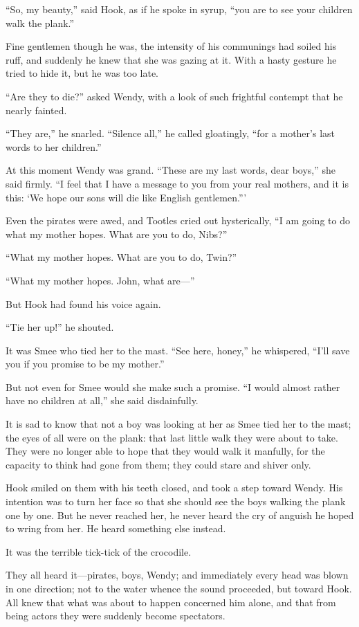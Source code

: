 ``So, my beauty,'' said Hook, as if he spoke in syrup, ``you are to see
your children walk the plank.''

Fine gentlemen though he was, the intensity of his communings had
soiled his ruff, and suddenly he knew that she was gazing at it. With a
hasty gesture he tried to hide it, but he was too late.

``Are they to die?'' asked Wendy, with a look of such frightful contempt
that he nearly fainted.

``They are,'' he snarled. ``Silence all,'' he called gloatingly, ``for a
mother's last words to her children.''

At this moment Wendy was grand. ``These are my last words, dear boys,''
she said firmly. ``I feel that I have a message to you from your real
mothers, and it is this: ‘We hope our sons will die like English
gentlemen.'''

Even the pirates were awed, and Tootles cried out hysterically, ``I am
going to do what my mother hopes. What are you to do, Nibs?''

``What my mother hopes. What are you to do, Twin?''

``What my mother hopes. John, what are—''

But Hook had found his voice again.

``Tie her up!'' he shouted.

It was Smee who tied her to the mast. ``See here, honey,'' he whispered,
``I'll save you if you promise to be my mother.''

But not even for Smee would she make such a promise. ``I would almost
rather have no children at all,'' she said disdainfully.

It is sad to know that not a boy was looking at her as Smee tied her to
the mast; the eyes of all were on the plank: that last little walk they
were about to take. They were no longer able to hope that they would
walk it manfully, for the capacity to think had gone from them; they
could stare and shiver only.

Hook smiled on them with his teeth closed, and took a step toward
Wendy. His intention was to turn her face so that she should see the
boys walking the plank one by one. But he never reached her, he never
heard the cry of anguish he hoped to wring from her. He heard something
else instead.

It was the terrible tick-tick of the crocodile.

They all heard it—pirates, boys, Wendy; and immediately every head was
blown in one direction; not to the water whence the sound proceeded,
but toward Hook. All knew that what was about to happen concerned him
alone, and that from being actors they were suddenly become spectators.

